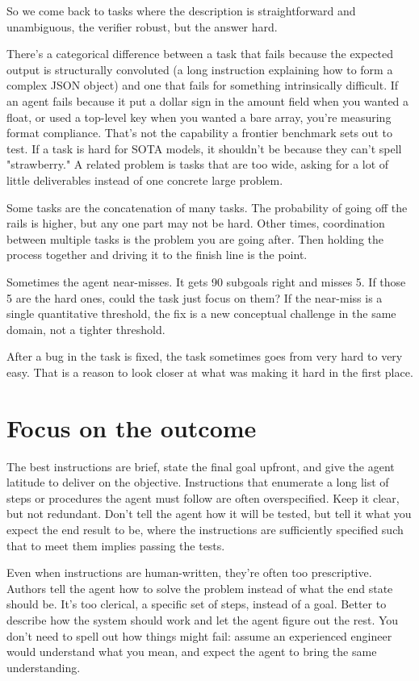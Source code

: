 \documentclass[11pt]{article}
\begin{document}
So we come back to tasks where the description is straightforward and unambiguous, the verifier robust, but the answer hard.

There's a categorical difference between a task that fails because the expected output is structurally convoluted (a long instruction explaining how to form a complex JSON object) and one that fails for something intrinsically difficult. If an agent fails because it put a dollar sign in the amount field when you wanted a float, or used a top-level key when you wanted a bare array, you're measuring format compliance. That's not the capability a frontier benchmark sets out to test. If a task is hard for SOTA models, it shouldn't be because they can't spell "strawberry." A related problem is tasks that are too wide, asking for a lot of little deliverables instead of one concrete large problem.

Some tasks are the concatenation of many tasks. The probability of going off the rails is higher, but any one part may not be hard. Other times, coordination between multiple tasks is the problem you are going after. Then holding the process together and driving it to the finish line is the point.

Sometimes the agent near-misses. It gets 90 subgoals right and misses 5. If those 5 are the hard ones, could the task just focus on them? If the near-miss is a single quantitative threshold, the fix is a new conceptual challenge in the same domain, not a tighter threshold.

After a bug in the task is fixed, the task sometimes goes from very hard to very easy. That is a reason to look closer at what was making it hard in the first place.

\section{Focus on the outcome}

The best instructions are brief, state the final goal upfront, and give the agent latitude to deliver on the objective. Instructions that enumerate a long list of steps or procedures the agent must follow are often overspecified. Keep it clear, but not redundant. Don't tell the agent how it will be tested, but tell it what you expect the end result to be, where the instructions are sufficiently specified such that to meet them implies passing the tests.

Even when instructions are human-written, they're often too prescriptive. Authors tell the agent how to solve the problem instead of what the end state should be. It's too clerical, a specific set of steps, instead of a goal. Better to describe how the system should work and let the agent figure out the rest. You don't need to spell out how things might fail: assume an experienced engineer would understand what you mean, and expect the agent to bring the same understanding.
\end{document}
